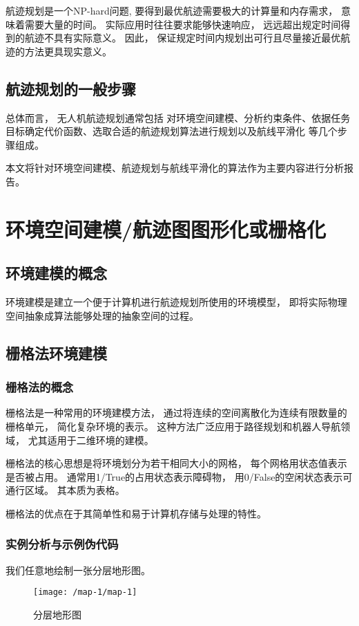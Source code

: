 \documentclass[12pt,a4paper,oneside,UTF8]{ctexart}
\begin{document}
航迹规划是一个NP-hard问题,
要得到最优航迹需要极大的计算量和内存需求，
意味着需要大量的时间。
实际应用时往往要求能够快速响应，
远远超出规定时间得到的航迹不具有实际意义。
因此，
保证规定时间内规划出可行且尽量接近最优航迹的方法更具现实意义。

\subsection{航迹规划的一般步骤}
总体而言，
无人机航迹规划通常包括
对环境空间建模、分析约束条件、依据任务目标确定代价函数、选取合适的航迹规划算法进行规划以及航线平滑化
等几个步骤组成\textsuperscript{\cite{ref3}}。

本文将针对环境空间建模、航迹规划与航线平滑化的算法作为主要内容进行分析报告。
\newpage\section{环境空间建模/航迹图图形化或栅格化}
\subsection{环境建模的概念}
环境建模是建立一个便于计算机进行航迹规划所使用的环境模型，
即将实际物理空间抽象成算法能够处理的抽象空间的过程。
\subsection{栅格法环境建模}
\subsubsection{栅格法的概念}
栅格法是一种常用的环境建模方法，
通过将连续的空间离散化为连续有限数量的栅格单元，
简化复杂环境的表示。
这种方法广泛应用于路径规划和机器人导航领域，
尤其适用于二维环境的建模。

栅格法的核心思想是将环境划分为若干相同大小的网格，
每个网格用状态值表示是否被占用。
通常用1/True的占用状态表示障碍物，
用0/False的空闲状态表示可通行区域。
其本质为表格。

栅格法的优点在于其简单性和易于计算机存储与处理的特性。
\subsubsection{实例分析与示例伪代码}
我们任意地绘制一张分层地形图。

\begin{figure}[H]
  \centering
  \texttt{[image: /map-1/map-1]}
  \caption{分层地形图}
  \label{fig:map-1}
\end{figure}
\end{document}

